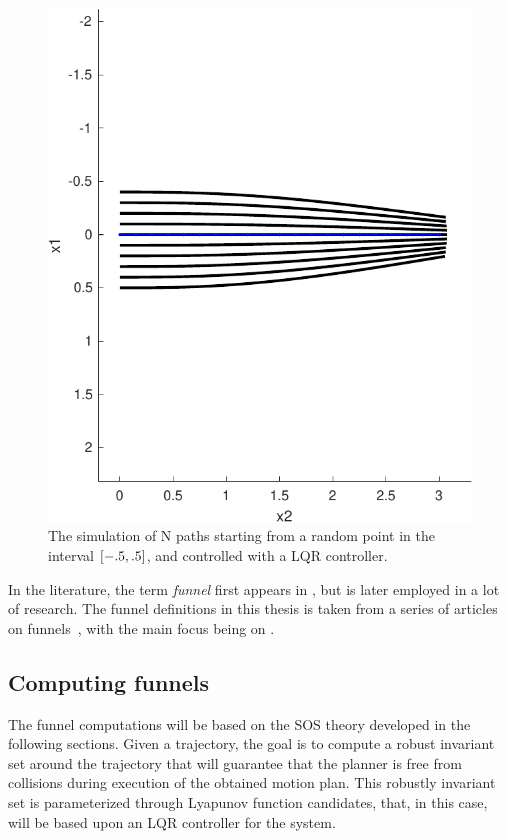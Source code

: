\begin{figure}
  \centering \includegraphics[scale=.6]{figures/preliminaries/montecarlofunnel}
  \caption{The simulation of N paths starting from a random point in the
    interval \(\lbrack-.5,.5\rbrack\), and controlled with a LQR controller.}
  \label{fig:monte-carlo-sim}
\end{figure}

In the literature, the term \textit{funnel} first appears in
\textcite{masonMechanicsManipulation1985}, but is later employed in a lot of
research. The funnel definitions in this thesis is taken from a series of
articles on funnels~\cite{Tobenkin_2011,tedrakeLQRtreesFeedbackMotion2009,
  majumdarRobustOnlineMotion2013,
  majumdarFunnelLibrariesRealtime2017,ahmadi2014dsos}, with the main focus being
on \textcite{majumdarFunnelLibrariesRealtime2017}.

\subsection{Computing funnels}

The funnel computations will be based on the \ac{SOS} theory developed in the
following sections. Given a trajectory, the goal is to compute a robust
invariant set around the trajectory that will guarantee that the planner is free
from collisions during execution of the obtained motion plan. This robustly
invariant set is parameterized through Lyapunov function candidates, that, in
this case, will be based upon an \ac{LQR} controller for the system.

